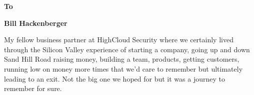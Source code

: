 \documentclass{book}
\newenvironment{dedication}
  {%
   \thispagestyle{empty}%
   \Large\textbf{{To}}
   \vspace*{\stretch{1}}%
   \itshape             %
   \centering          %
  }
  {\par %
   \vspace{\stretch{3}} %
   \clearpage           %
  }
\begin{document}
\setcounter{urls}{1}

\begin{dedication}

\textbf{Bill Hackenberger}

\vspace{1cm}
My fellow business partner at HighCloud Security where we certainly lived through the Silicon Valley experience of starting a company, going up and down Sand Hill Road raising money, building a team, products, getting customers, running low on money more times that we'd care to remember but ultimately leading to an exit. Not the big one we hoped for but it was a journey to remember for sure.
\end{dedication}


\tableofcontents
















\end{document}
